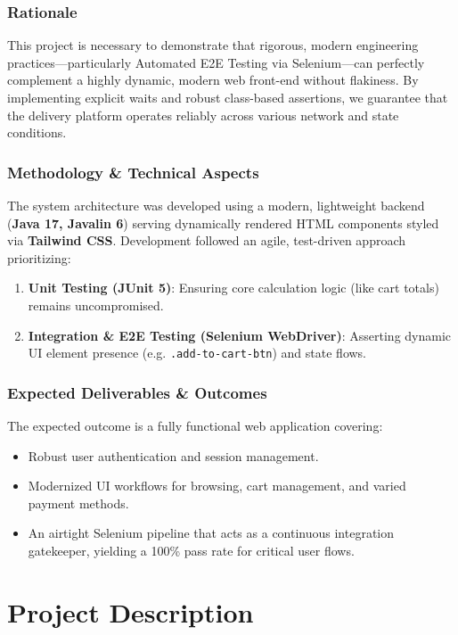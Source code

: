 \documentclass[12pt,a4paper]{report}
\begin{document}
\subsection{Rationale}
This project is necessary to demonstrate that rigorous, modern engineering practices—particularly Automated E2E Testing via Selenium—can perfectly complement a highly dynamic, modern web front-end without flakiness. By implementing explicit waits and robust class-based assertions, we guarantee that the delivery platform operates reliably across various network and state conditions.

\subsection{Methodology \& Technical Aspects}
The system architecture was developed using a modern, lightweight backend (\textbf{Java 17, Javalin 6}) serving dynamically rendered HTML components styled via \textbf{Tailwind CSS}. Development followed an agile, test-driven approach prioritizing:
\begin{enumerate}
    \item \textbf{Unit Testing (JUnit 5)}: Ensuring core calculation logic (like cart totals) remains uncompromised.
    \item \textbf{Integration \& E2E Testing (Selenium WebDriver)}: Asserting dynamic UI element presence (e.g. \texttt{.add-to-cart-btn}) and state flows. 
\end{enumerate}

\subsection{Expected Deliverables \& Outcomes}
The expected outcome is a fully functional web application covering:
\begin{itemize}
    \item Robust user authentication and session management.
    \item Modernized UI workflows for browsing, cart management, and varied payment methods.
    \item An airtight Selenium pipeline that acts as a continuous integration gatekeeper, yielding a 100\% pass rate for critical user flows.
\end{itemize}

\chapter{Project Description}
\end{document}
